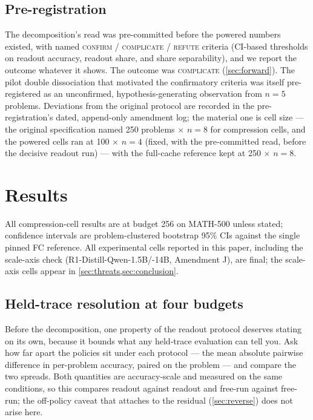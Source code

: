 \documentclass{article}
\begin{document}
\subsection{Pre-registration}
The decomposition's read was pre-committed before the powered numbers existed, with named \textsc{confirm} / \textsc{complicate} / \textsc{refute} criteria (CI-based thresholds on readout accuracy, readout share, and share separability), and we report the outcome whatever it shows. The outcome was \textsc{complicate} (\cref{sec:forward}). The pilot double dissociation that motivated the confirmatory criteria was itself pre-registered as an unconfirmed, hypothesis-generating observation from $n{=}5$ problems. Deviations from the original protocol are recorded in the pre-registration's dated, append-only amendment log; the material one is cell size --- the original specification named 250 problems $\times$ $n{=}8$ for compression cells, and the powered cells ran at 100 $\times$ $n{=}4$ (fixed, with the pre-committed read, before the decisive readout run) --- with the full-cache reference kept at 250 $\times$ $n{=}8$.

\section{Results}
\label{sec:results}

All compression-cell results are at budget 256 on MATH-500 unless stated; confidence intervals are problem-clustered bootstrap 95\% CIs against the single pinned FC reference. All experimental cells reported in this paper, including the scale-axis check (R1-Distill-Qwen-1.5B/-14B, Amendment J), are final; the scale-axis cells appear in \cref{sec:threats,sec:conclusion}.

\subsection{Held-trace resolution at four budgets}
\label{sec:resolution}

Before the decomposition, one property of the readout protocol deserves stating on its own, because it bounds what any held-trace evaluation can tell you. Ask how far apart the policies sit under each protocol --- the mean absolute pairwise difference in per-problem accuracy, paired on the problem --- and compare the two spreads. Both quantities are accuracy-scale and measured on the same conditions, so this compares readout against readout and free-run against free-run; the off-policy caveat that attaches to the residual (\cref{sec:reverse}) does not arise here.
\end{document}
